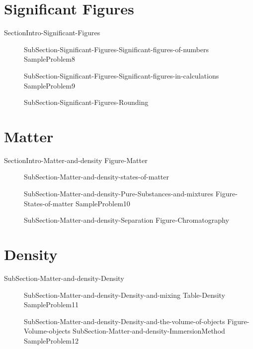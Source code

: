 \documentclass[main.tex]{subfiles}
\newcommand\chapterlabel{Ch-measurements}\setcounter{figurenewcounter}{0}\setcounter{tablenewcounter}{0}\setcounter{formulanewcounter}{0}
\begin{document}
\section{Significant Figures}
{SectionIntro-Significant-Figures}
\sloppy\begin{description}
\item[]{SubSection-Significant-Figures-Significant-figures-of-numbers}
{SampleProblem8}
\item[]{SubSection-Significant-Figures-Significant-figures-in-calculations}
{SampleProblem9}
 \item[]{SubSection-Significant-Figures-Rounding}
\end{description}

 
\section{Matter}
{SectionIntro-Matter-and-density}
{Figure-Matter}		
\sloppy\begin{description}
\item[] {SubSection-Matter-and-density-states-of-matter}
\item[]{SubSection-Matter-and-density-Pure-Substances-and-mixtures}
{Figure-States-of-matter}
{SampleProblem10}
\item[]{SubSection-Matter-and-density-Separation}
{Figure-Chromatography}		
\end{description}

\section{Density}
{SubSection-Matter-and-density-Density}
\sloppy\begin{description}
\item[]{SubSection-Matter-and-density-Density-and-mixing}
{Table-Density} 
{SampleProblem11}
\item[]{SubSection-Matter-and-density-Density-and-the-volume-of-objects}
{Figure-Volume-objects}
{SubSection-Matter-and-density-ImmersionMethod}
{SampleProblem12}
\end{description}
\clearpage\thispagestyle{empty}\mbox{}\clearpage
\end{document}
